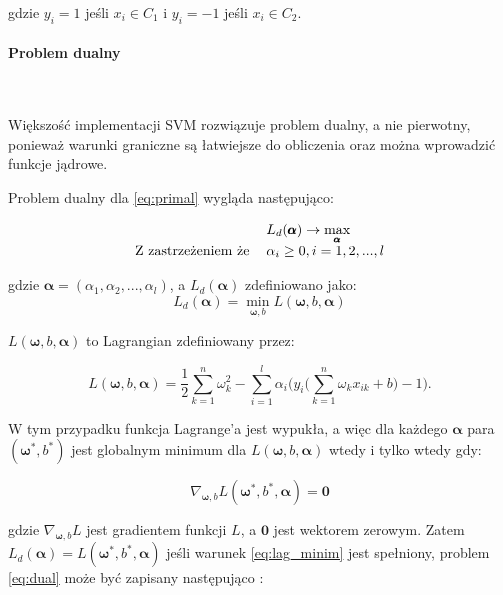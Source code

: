 \documentclass[paper=a4, fontsize=11pt]{scrartcl} %
\newcommand{\myparagraph}[1]{\paragraph{#1}\mbox{}\\}
\numberwithin{equation}{section} %
\numberwithin{figure}{section} %
\begin{document}
    gdzie $y_i=1$ jeśli $x_i \in C_1$ i $y_i=-1$ jeśli $x_i \in C_2$.
\myparagraph{Problem dualny}
    \par Większość implementacji SVM rozwiązuje problem dualny, a nie pierwotny, ponieważ
    warunki graniczne są łatwiejsze do obliczenia oraz można wprowadzić funkcje jądrowe.

    \par Problem dualny dla \ref{eq:primal} wygląda następująco:

    \begin{equation} \label{eq:dual}
        \begin{tabular}{rl}
            & $L_d(\pmb{\alpha}) \rightarrow \max\limits_{\pmb{\alpha}}$ \\
            Z zastrzeżeniem że & $\alpha_i \geq 0,i=1,2,...,l$
        \end{tabular}
    \end{equation}

    gdzie $\pmb{\alpha} = (\alpha_1,\alpha_2,...,\alpha_l)$, a $L_d(\pmb{\alpha})$ zdefiniowano jako:
    \begin{equation}
        L_d(\pmb{\alpha}) = \min\limits_{\pmb{\omega},b}L(\pmb{\omega},b,\pmb{\alpha})
    \end{equation}

    $L(\pmb{\omega},b,\pmb{\alpha})$ to Lagrangian zdefiniowany przez: 

    \begin{equation} \label{eq:lagrange}
        L(\pmb{\omega},b,\pmb{\alpha}) = \frac{1}{2}\sum\limits_{k=1}^{n}\omega_{k}^2 -
        \sum\limits_{i=1}^{l} \alpha_i \Bigg(y_i \Bigg( \sum\limits_{k=1}^{n} \omega_k x_{ik}
        +b \Bigg) -1 \Bigg).
    \end{equation}

    \par W tym przypadku funkcja Lagrange'a jest wypukła, a więc dla każdego $\pmb{\alpha}$ para
    $(\pmb{\omega^*},b^*)$ jest globalnym minimum dla $L(\pmb{\omega},b,\pmb{\alpha})$ wtedy i
    tylko wtedy gdy:

    \begin{equation} \label{eq:lag_minim}
        \nabla_{\pmb{\omega},b} L(\pmb{\omega}^*,b^*,\pmb{\alpha}) = \pmb{0}
    \end{equation}

    gdzie $\nabla_{\pmb{\omega},b} L$ jest gradientem funkcji $L$, a $\pmb{0}$ jest wektorem
    zerowym. Zatem $L_d(\pmb{\alpha}) = L(\pmb{\omega}^*,b^*,\pmb{\alpha})$ jeśli warunek
    \ref{eq:lag_minim} jest spełniony, problem \ref{eq:dual} może być zapisany następująco
    \cite{nefedov2016support}:
\end{document}
